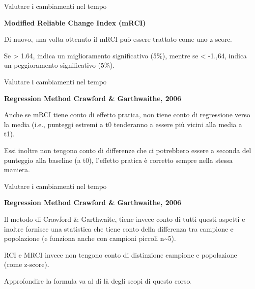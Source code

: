 \documentclass[
  ignorenonframetext,
]{beamer}
\begin{document}
\begin{frame}{Valutare i cambiamenti nel tempo}
\label{valutare-i-cambiamenti-nel-tempo-12}
\begin{center}
\textbf{Modified Reliable Change Index (mRCI)}
\end{center}
\vspace{2em}

Di nuovo, una volta ottenuto il mRCI può essere trattato come uno
z-score.

Se \textgreater{} 1.64, indica un miglioramento significativo (5\%),
mentre se \textless{} -1.,64, indica un peggioramento significativo
(5\%).
\end{frame}

\begin{frame}{Valutare i cambiamenti nel tempo}
\label{valutare-i-cambiamenti-nel-tempo-13}
\begin{center}
\textbf{Regression Method Crawford \& Garthwaithe, 2006}
\end{center}
\vspace{2em}

Anche se mRCI tiene conto di effetto pratica, non tiene conto di
regressione verso la media (i.e., punteggi estremi a t0 tenderanno a
essere più vicini alla media a t1).

Essi inoltre non tengono conto di differenze che ci potrebbero essere a
seconda del punteggio alla baseline (a t0), l'effetto pratica è corretto
sempre nella stessa maniera.
\end{frame}

\begin{frame}{Valutare i cambiamenti nel tempo}
\label{valutare-i-cambiamenti-nel-tempo-14}
\begin{center}
\textbf{Regression Method Crawford \& Garthwaithe, 2006}
\end{center}
\vspace{2em}

Il metodo di Crawford \& Garthwaite, tiene invece conto di tutti questi
aspetti e inoltre fornisce una statistica che tiene conto della
differenza tra campione e popolazione (e funziona anche con campioni
piccoli n\textasciitilde5).

RCI e MRCI invece non tengono conto di distinzione campione e
popolazione (come z-score).

Approfondire la formula va al di là degli scopi di questo corso.
\end{frame}
\end{document}

